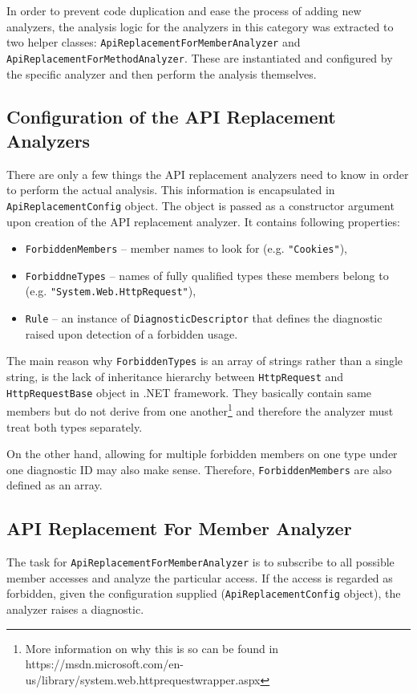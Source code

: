 \documentclass[
  digital, %
  table,   %
  lof,     %
  lot,     %
  oneside,
]{fithesis3}
\begin{document}
In order to prevent code duplication and ease the process of adding new analyzers, the analysis logic for the analyzers in this category was extracted to two helper classes: \texttt{ApiReplacementForMemberAnalyzer} and \texttt{ApiReplacementForMethodAnalyzer}. These are instantiated and configured by the specific analyzer and then perform the analysis themselves.

\subsection{Configuration of the API Replacement Analyzers}
There are only a few things the API replacement analyzers need to know in order to perform the actual analysis. This information is encapsulated in \texttt{ApiReplacementConfig} object. The object is passed as a constructor argument upon creation of the API replacement analyzer. It contains following properties:

\begin{itemize}
  \item \texttt{ForbiddenMembers} -- member names to look for (e.g. \texttt{"Cookies"}), 
  \item \texttt{ForbiddneTypes} -- names of fully qualified types these members belong to (e.g. \texttt{"System.Web.HttpRequest"}), 
  \item \texttt{Rule} -- an instance of \texttt{DiagnosticDescriptor} that defines the diagnostic raised upon detection of a forbidden usage.
\end{itemize} 

The main reason why \texttt{ForbiddenTypes} is an array of strings rather than a single string, is the lack of inheritance hierarchy between \texttt{HttpRequest} and \texttt{HttpRequestBase} object in .NET framework. They basically contain same members but do not derive from one another\footnote{More information on why this is so can be found in https://msdn.microsoft.com/en-us/library/system.web.httprequestwrapper.aspx} and therefore the analyzer must treat both types separately. 

On the other hand, allowing for multiple forbidden members on one type under one diagnostic ID may also make sense. Therefore, \texttt{ForbiddenMembers} are also defined as an array.

\subsection{API Replacement For Member Analyzer}
The task for \texttt{ApiReplacementForMemberAnalyzer} is to subscribe to all possible member accesses and analyze the particular access. If the access is regarded as forbidden, given the configuration supplied (\texttt{ApiReplacementConfig} object), the analyzer raises a diagnostic.
\end{document}
